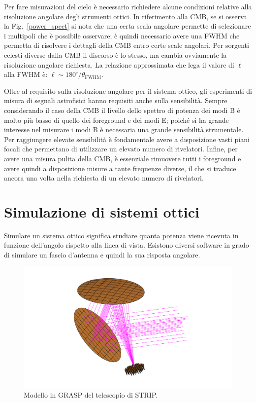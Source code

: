 \documentclass[12pt,a4paper,final]{book}
\begin{document}
Per fare misurazioni del cielo è necessario richiedere alcune condizioni relative alla risoluzione angolare degli strumenti ottici. In riferimento alla CMB, se si osserva la Fig.~\ref{power_spect} si nota che una certa scala angolare permette di selezionare i multipoli che è possibile osservare; è quindi necessario avere una FWHM che permetta di risolvere i dettagli della CMB entro certe scale angolari. Per sorgenti celesti diverse dalla CMB il discorso è lo stesso, ma cambia ovviamente la risoluzione angolare richiesta. La relazione approssimata che lega il valore di $\ell$ alla FWHM è: $\ell\sim{180^{\circ}}/{\theta_\text{FWHM}}$.


Oltre al requisito sulla risoluzione angolare per il sistema ottico, gli esperimenti di misura di segnali astrofisici hanno requisiti anche sulla sensibilità. Sempre considerando il caso della CMB il livello dello spettro di potenza dei modi B è molto più basso di quello dei foreground e dei modi E; poiché si ha grande interesse nel misurare i modi B è necessaria una grande sensibilità strumentale. Per raggiungere elevate sensibilità è fondamentale avere a disposizione vasti piani focali che permettano di utilizzare un elevato numero di rivelatori.
Infine, per avere una misura pulita della CMB, è essenziale rimuovere tutti i foreground e avere quindi a disposizione misure a tante frequenze diverse, il che si traduce ancora una volta nella richiesta di un elevato numero di rivelatori.




\section{Simulazione di sistemi ottici}\label{simulazioni}
Simulare un sistema ottico significa studiare quanta potenza viene ricevuta in funzione dell'angolo rispetto alla linea di vista. 
Esistono diversi software in grado di simulare un fascio d'antenna e quindi la sua risposta angolare.

\begin{figure}[!ht]
	\centering
	\includegraphics[width=0.6\linewidth]{../figures/strip.png}
	\caption{Modello in GRASP del telescopio di STRIP.}
	\label{strip}
\end{figure}
\end{document}
